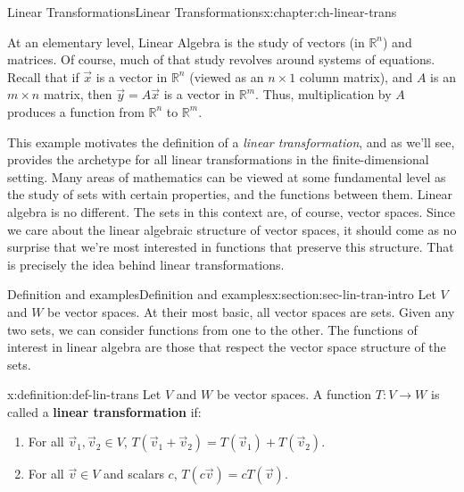 \documentclass[oneside,10pt,]{book}
\newcommand{\terminology}[1]{\textbf{#1}}
\numberwithin{equation}{section}
\newcommand{\R}{\mathbb{R}}
\begin{document}
%
%
\typeout{************************************************}
\typeout{************************************************}
%
\begin{chapterptx}{Linear Transformations}{}{Linear Transformations}{}{}{x:chapter:ch-linear-trans}
\begin{introduction}{}%
At an elementary level, Linear Algebra is the study of vectors (in \(\R^n\)) and matrices. Of course, much of that study revolves around systems of equations. Recall that if \(\vec{x}\) is a vector in \(\R^n\) (viewed as an \(n\times 1\) column matrix), and \(A\) is an \(m\times n\) matrix, then \(\vec{y}=A\vec{x}\) is a vector in \(\R^m\). Thus, multiplication by \(A\) produces a function from \(\R^n\) to \(\R^m\).%
\par
This example motivates the definition of a \emph{linear transformation}, and as we'll see, provides the archetype for all linear transformations in the finite-dimensional setting. Many areas of mathematics can be viewed at some fundamental level as the study of sets with certain properties, and the functions between them. Linear algebra is no different. The sets in this context are, of course, vector spaces. Since we care about the linear algebraic structure of vector spaces, it should come as no surprise that we're most interested in functions that preserve this structure. That is precisely the idea behind linear transformations.%
\end{introduction}%
%
%
\typeout{************************************************}
\typeout{************************************************}
%
\begin{sectionptx}{Definition and examples}{}{Definition and examples}{}{}{x:section:sec-lin-tran-intro}
Let \(V\) and \(W\) be vector spaces. At their most basic, all vector spaces are sets. Given any two sets, we can consider functions from one to the other. The functions of interest in linear algebra are those that respect the vector space structure of the sets.%
\begin{definition}{}{x:definition:def-lin-trans}%
Let \(V\) and \(W\) be vector spaces. A function \(T:V\to W\) is called a \terminology{linear transformation} if:%
\begin{enumerate}
\item{}For all \(\vec{v}_1,\vec{v}_2\in V\), \(T(\vec{v}_1+\vec{v}_2)=T(\vec{v}_1)+T(\vec{v}_2)\).%
\item{}For all \(\vec{v}\in V\) and scalars \(c\), \(T(c\vec{v})=cT(\vec{v})\).%

\end{enumerate}
\end{definition}
\end{sectionptx}
\end{chapterptx}
\end{document}

